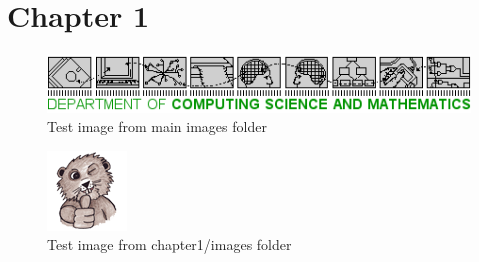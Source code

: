 \chapter{Chapter 1}

\begin{figure}[H]
	\includegraphics[width=\textwidth]{images/CSaMt}
	\caption{Test image from main images folder}
\end{figure}

\begin{figure}[H]
	\begin{center}
		\includegraphics{content/chapter1/images/beaver}
		\caption{Test image from chapter1/images folder}
	\end{center}
\end{figure}
